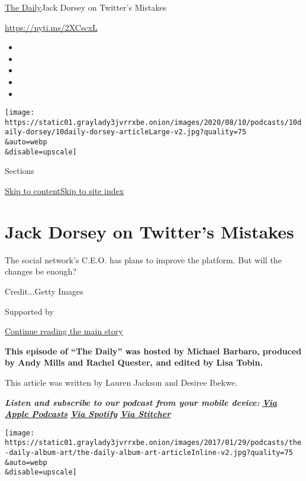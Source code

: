 \href{/podcasts/the-daily}{The Daily}\textbar{}Jack Dorsey on Twitter's
Mistakes

\url{https://nyti.ms/2XCscxL}

\begin{itemize}
\item
\item
\item
\item
\item
\end{itemize}

\texttt{[image: https://static01.graylady3jvrrxbe.onion/images/2020/08/10/podcasts/10daily-dorsey/10daily-dorsey-articleLarge-v2.jpg?quality=75\\\&auto=webp\\\&disable=upscale]}

Sections

\protect\hyperlink{site-content}{Skip to
content}\protect\hyperlink{site-index}{Skip to site index}

\hypertarget{jack-dorsey-on-twitters-mistakes}{%
\section{Jack Dorsey on Twitter's
Mistakes}\label{jack-dorsey-on-twitters-mistakes}}

The social network's C.E.O. has plans to improve the platform. But will
the changes be enough?

Credit...Getty Images

Supported by

\protect\hyperlink{after-sponsor}{Continue reading the main story}

\textbf{This episode of ``The Daily'' was hosted by Michael Barbaro,
produced by Andy Mills and Rachel Quester, and edited by Lisa Tobin.}

This article was written by Lauren Jackson and Desiree Ibekwe.

\emph{\textbf{Listen and subscribe to our podcast from your mobile
device:}}
\textbf{\href{https://itunes.apple.com/us/podcast/the-daily/id1200361736?mt=2}{\emph{Via
Apple Podcasts}}} \emph{\textbf{\textbar{}}}
\textbf{\href{https://open.spotify.com/show/3IM0lmZxpFAY7CwMuv9H4g?si=SfuMSC55R1qprFsRZU3_zw}{\emph{Via
Spotify}}} \emph{\textbf{\textbar{}}}
\textbf{\href{http://www.stitcher.com/podcast/the-new-york-times/the-daily-10}{\emph{Via
Stitcher}}}

\texttt{[image: https://static01.graylady3jvrrxbe.onion/images/2017/01/29/podcasts/the-daily-album-art/the-daily-album-art-articleInline-v2.jpg?quality=75\\\&auto=webp\\\&disable=upscale]}


